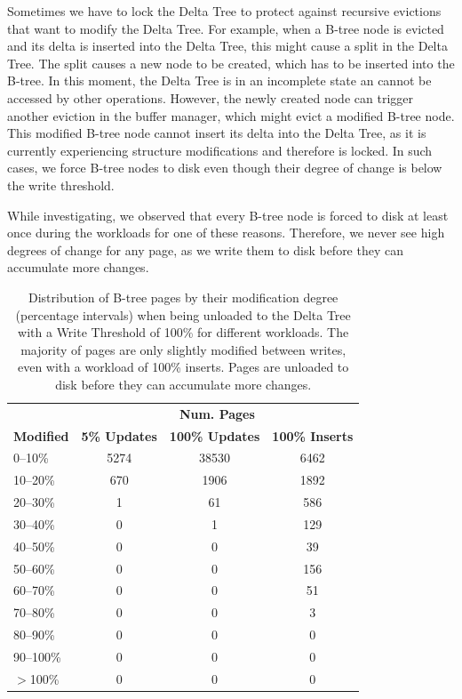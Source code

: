 \begin{enumerate}
Sometimes we have to lock the Delta Tree to protect against recursive evictions that want to modify the Delta Tree.
For example, when a B-tree node is evicted and its delta is inserted into the Delta Tree, this might cause a split in the Delta Tree.
The split causes a new node to be created, which has to be inserted into the B-tree.
In this moment, the Delta Tree is in an incomplete state an cannot be accessed by other operations.
However, the newly created node can trigger another eviction in the buffer manager, which might evict a modified B-tree node.
This modified B-tree node cannot insert its delta into the Delta Tree, as it is currently experiencing structure modifications and therefore is locked.
In such cases, we force B-tree nodes to disk even though their degree of change is below the write threshold.

While investigating, we observed that every B-tree node is forced to disk at least once during the workloads for one of these reasons.
Therefore, we never see high degrees of change for any page, as we write them to disk before they can accumulate more changes.

\end{enumerate}

\begin{table}[ht]
  \centering
    \begin{tabular}{l|ccc}
    \toprule
    & \multicolumn{3}{c}{\textbf{Num. Pages}} \\
    \cmidrule(lr){2-4}
    \textbf{Modified} & \textbf{5\% Updates} & \textbf{100\% Updates} & \textbf{100\% Inserts} \\
    \midrule
    0--10\%   & 5274 &  38530 &  6462 \\
    10--20\%  & 670 & 1906 &  1892 \\
    20--30\%  & 1 & 61 & 586 \\
    30--40\%  & 0 & 1 & 129\\
    40--50\%  & 0 & 0 & 39 \\
    50--60\%  & 0 & 0 & 156 \\
    60--70\%  & 0 & 0 & 51 \\
    70--80\%  & 0 & 0 & 3 \\
    80--90\%  & 0 & 0 & 0 \\
    90--100\% & 0 & 0 & 0 \\
    $>$100\% & 0 & 0 & 0 \\
    \bottomrule
  \end{tabular}
  \caption{Distribution of B-tree pages by their modification degree (percentage intervals) when being unloaded to the Delta Tree with a Write Threshold of 100\% for different workloads. The majority of pages are only slightly modified between writes, even with a workload of 100\% inserts. Pages are unloaded to disk before they can accumulate more changes.}
  \label{tab:modification-degree}
\end{table}

